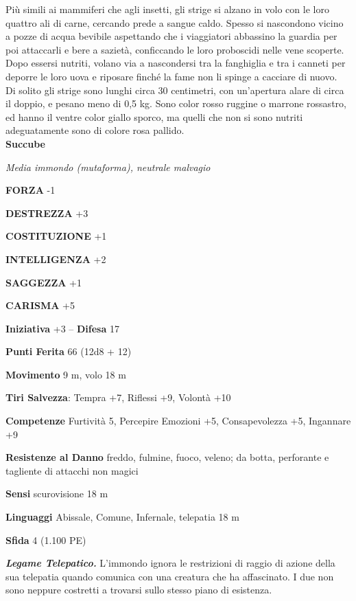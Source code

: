 \begin{multicols}{2}
Più simili ai mammiferi che agli insetti, gli strige si alzano in volo con le loro quattro ali di carne, cercando prede a sangue caldo. Spesso si nascondono vicino a pozze di acqua bevibile aspettando che i viaggiatori abbassino la guardia per poi attaccarli e bere a sazietà, conficcando le loro proboscidi nelle vene scoperte. Dopo essersi nutriti, volano via a nascondersi tra la fanghiglia e tra i canneti per deporre le loro uova e riposare finché la fame non li spinge a cacciare di nuovo.\\

Di solito gli strige sono lunghi circa 30 centimetri, con un'apertura alare di circa il doppio, e pesano meno di 0,5 kg. Sono color rosso ruggine o marrone rossastro, ed hanno il ventre color giallo sporco, ma quelli che non si sono nutriti adeguatamente sono di colore rosa pallido.\\


\medskip{}\textbf{Succube}

\emph{Media immondo (mutaforma), neutrale malvagio}

\textbf{FORZA} -1

\textbf{DESTREZZA} +3

\textbf{COSTITUZIONE} +1

\textbf{INTELLIGENZA} +2

\textbf{SAGGEZZA} +1

\textbf{CARISMA} +5

\textbf{Iniziativa} +3 -- \textbf{Difesa} 17

\textbf{Punti Ferita} 66 (12d8 + 12)

\textbf{Movimento} 9 m, volo 18 m

\textbf{Tiri Salvezza}: Tempra +7, Riflessi +9, Volontà +10

\textbf{Competenze} Furtività 5, Percepire Emozioni +5, Consapevolezza +5, Ingannare +9

\textbf{Resistenze al Danno} freddo, fulmine, fuoco, veleno; da botta, perforante e tagliente di attacchi non magici

\textbf{Sensi} scurovisione 18 m

\textbf{Linguaggi} Abissale, Comune, Infernale, telepatia 18 m

\textbf{Sfida} 4 (1.100 PE)

\emph{\textbf{Legame Telepatico.}} L'immondo ignora le restrizioni di raggio di azione della sua telepatia quando comunica con una creatura che ha affascinato. I due non sono neppure costretti a trovarsi sullo stesso piano di esistenza.


\end{multicols}

